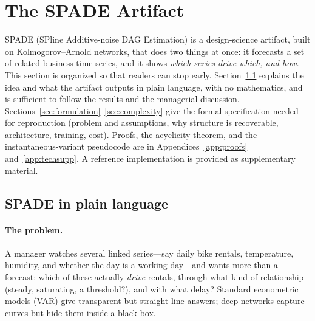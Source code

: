 
\section{The SPADE Artifact}
\label{sec:method}

SPADE (SPline Additive-noise DAG Estimation) is a design-science artifact, built
on Kolmogorov--Arnold networks, that does two things at once: it forecasts a set
of related business time series, and it shows \emph{which series drive which, and
how}. This section is organized so that readers can stop early. Section~\ref{sec:plain}
explains the idea and what the artifact outputs in plain language, with no
mathematics, and is sufficient to follow the results and the managerial
discussion. Sections~\ref{sec:formulation}--\ref{sec:complexity} give the formal
specification needed for reproduction (problem and assumptions, why structure is
recoverable, architecture, training, cost). Proofs, the acyclicity theorem, and
the instantaneous-variant pseudocode are in Appendices~\ref{app:proofs}
and~\ref{app:techsupp}. A reference implementation is provided as supplementary material.

\subsection{SPADE in plain language}
\label{sec:plain}

\paragraph{The problem.} A manager watches several linked series---say daily
bike rentals, temperature, humidity, and whether the day is a working day---and
wants more than a forecast: which of these actually \emph{drive} rentals, through
what kind of relationship (steady, saturating, a threshold?), and with what delay?
Standard econometric models (VAR) give transparent but straight-line answers;
deep networks capture curves but hide them inside a black box.


